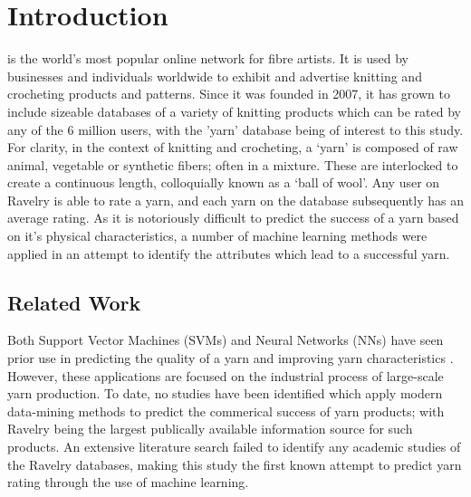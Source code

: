 \documentclass[journal]{IEEEtran}
\begin{document}
\section{Introduction}
% 
% 
% 
% 
  is the world’s most popular online network for fibre artists. It is used by businesses and individuals worldwide to exhibit and advertise knitting and crocheting products and patterns. Since it was founded in 2007, it has grown to include sizeable databases of a variety of knitting products which can be rated by any of the 6 million users, with the 'yarn' database being of interest to this study. For clarity, in the context of knitting and crocheting, a ‘yarn’ is composed of raw animal, vegetable or synthetic fibers; often in a mixture. These are interlocked to create a continuous length, colloquially known as a ‘ball of wool’. Any user on Ravelry is able to rate a yarn, and each yarn on the database subsequently has an average rating. As it is notoriously difficult to predict the success of a yarn based on it's physical characteristics, a number of machine learning methods were applied in an attempt to identify the attributes which lead to a successful yarn.  


\subsection{Related Work}
Both Support Vector Machines (SVMs) and Neural Networks (NNs) have seen prior use in predicting the quality of a yarn \cite{Hao2010,Bo2010} and improving yarn characteristics \cite{chat2011,basu2011}. However, these applications are focused on the industrial process of large-scale yarn production. To date, no studies have been identified which apply modern data-mining methods to predict the commerical success of yarn products; with Ravelry being the largest publically available information source for such products. An extensive literature search failed to identify any academic studies of the Ravelry databases, making this study the first known attempt to predict yarn rating through the use of machine learning.
\end{document}
